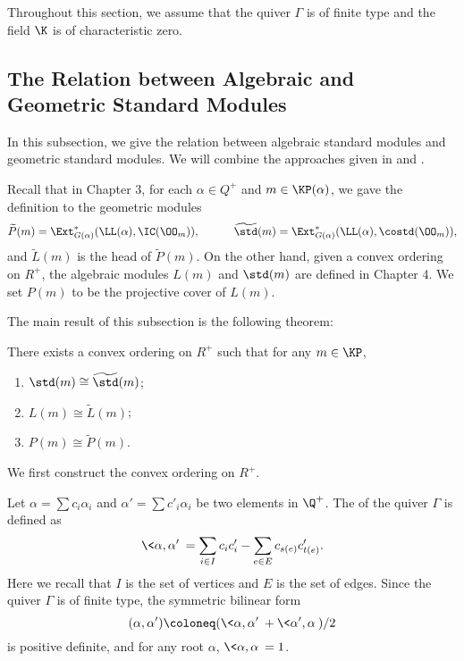 Throughout this section, we assume that the quiver $\Gamma$ is of finite type
and the field $\K$ is of characteristic zero.

\subsection{The Relation between Algebraic and Geometric Standard Modules}

In this subsection, we give the relation between algebraic standard modules
and geometric standard modules. We will combine the approaches
given in \cite{K2} and \cite{Mc2}.

Recall that in Chapter 3, for each $\alpha\in Q^+$ and $m\in\KP(\alpha)$,
we gave the definition to the geometric modules $$\widetilde{P}(m)
 = \Ext^*_{G(\alpha)}(\LL(\alpha),\IC(\OO_m)),\hspace{3em}
\widetilde{\std}(m) = \Ext^*_{G(\alpha)}(\LL(\alpha),\costd(\OO_m)),$$
and $\widetilde{L}(m)$ is the head of $\widetilde{P}(m)$. On the other hand,
given a convex ordering on $R^+$, the algebraic modules
$L(m)$ and $\std(m)$ are defined in Chapter 4. We set $P(m)$
to be the projective cover of $L(m)$.

The main result of this subsection is the following theorem:

\begin{theorem}\label{alg-geo}
    There exists a convex ordering on $R^+$ such that for any 
    $m\in\KP$,
    \begin{enumerate}[1)]
        \item $\std(m)\cong\widetilde{\std}(m)$;
        \item $L(m)\cong\widetilde{L}(m)$;
        \item $P(m)\cong\widetilde{P}(m)$.
    \end{enumerate}
\end{theorem}

We first construct the convex ordering on $R^+$.

Let $\alpha = \sum c_i\alpha_i$ and $\alpha' = \sum c'_i\alpha_i$
be two elements in $\Q^+$. The  of the 
quiver $\Gamma$ is defined as $$\<\alpha,\alpha'\>
 = \sum_{i\in I}c_ic'_i-\sum_{e\in E}c_{s(e)}c'_{t(e)}.$$
Here we recall that $I$ is the set of vertices and $E$
is the set of edges.
Since the quiver $\Gamma$ is of finite type, the symmetric
bilinear form 
\[
    (\alpha,\alpha') \coloneq  (\<\alpha,\alpha'\>
    +\<\alpha',\alpha\>)/2
\] 
is positive definite, and 
for any root $\alpha$, $\<\alpha,\alpha\> = 1$.

